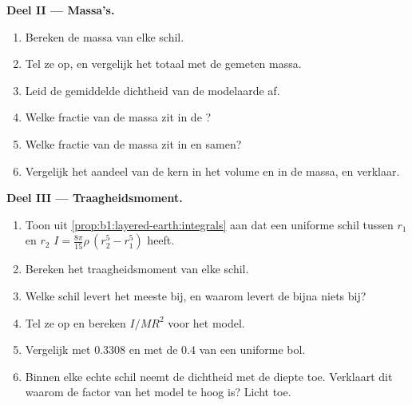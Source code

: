 \begin{problem}
\noindent\textbf{Deel II --- Massa's.}
\begin{enumerate}[resume]
  \item Bereken de massa van elke schil.
  \item Tel ze op, en vergelijk het totaal met de gemeten massa.
  \item Leid de gemiddelde dichtheid van de modelaarde af.
  \item Welke fractie van de massa zit in de ?
  \item Welke fractie van de massa zit in  en  samen?
  \item Vergelijk het aandeel van de kern in het volume en in de massa, en verklaar.
\end{enumerate}

\noindent\textbf{Deel III --- Traagheidsmoment.}
\begin{enumerate}[resume]
  \item Toon uit \cref{prop:b1:layered-earth:integrals} aan dat een uniforme schil tussen $r_1$ en $r_2$ $I = \tfrac{8\pi}{15}\rho\,(r_2^5 - r_1^5)$ heeft.
  \item Bereken het traagheidsmoment van elke schil.
  \item Welke schil levert het meeste bij, en waarom levert de  bijna niets bij?
  \item Tel ze op en bereken $I/MR^2$ voor het model.
  \item Vergelijk met $0.3308$ en met de $0.4$ van een uniforme bol.
  \item Binnen elke echte schil neemt de dichtheid met de diepte toe. Verklaart dit waarom de factor van het model te hoog is? Licht toe.
\end{enumerate}


\end{problem}
